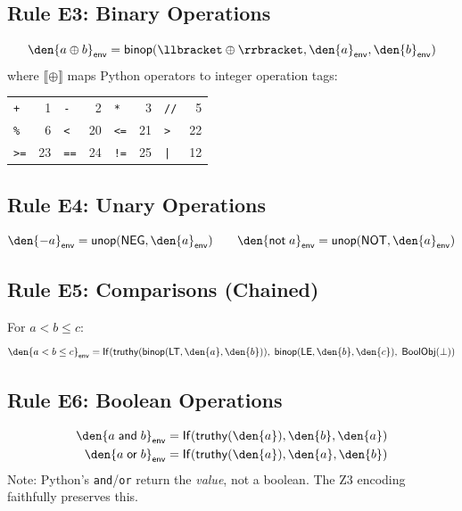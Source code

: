 \subsection{Rule E3: Binary Operations}
\[
  \den{a \oplus b}_\mathsf{env} = \mathsf{binop}(\llbracket \oplus \rrbracket,
    \den{a}_\mathsf{env}, \den{b}_\mathsf{env})
\]
where $\llbracket \oplus \rrbracket$ maps Python operators to integer
operation tags:
\begin{center}
\small
\begin{tabular}{l r l r l r l r}
  \texttt{+} & 1 & \texttt{-} & 2 & \texttt{*} & 3 &
  \texttt{//} & 5 \\
  \texttt{\%} & 6 & \texttt{<} & 20 & \texttt{<=} & 21 &
  \texttt{>} & 22 \\
  \texttt{>=} & 23 & \texttt{==} & 24 & \texttt{!=} & 25 &
  \texttt{|} & 12 \\
\end{tabular}
\end{center}

\subsection{Rule E4: Unary Operations}
\[
  \den{-a}_\mathsf{env} = \mathsf{unop}(\mathsf{NEG}, \den{a}_\mathsf{env})
  \qquad
  \den{\mathsf{not}\; a}_\mathsf{env} = \mathsf{unop}(\mathsf{NOT},
    \den{a}_\mathsf{env})
\]

\subsection{Rule E5: Comparisons (Chained)}
For $a < b \leq c$:
\[
  \den{a < b \leq c}_\mathsf{env} = \mathsf{If}(
    \mathsf{truthy}(\mathsf{binop}(\mathsf{LT}, \den{a}, \den{b})),\;
    \mathsf{binop}(\mathsf{LE}, \den{b}, \den{c}),\;
    \mathsf{BoolObj}(\bot))
\]

\subsection{Rule E6: Boolean Operations}
\begin{align}
  \den{a \;\mathsf{and}\; b}_\mathsf{env} &= \mathsf{If}(
    \mathsf{truthy}(\den{a}), \den{b}, \den{a}) \\
  \den{a \;\mathsf{or}\; b}_\mathsf{env} &= \mathsf{If}(
    \mathsf{truthy}(\den{a}), \den{a}, \den{b})
\end{align}
Note: Python's \texttt{and}/\texttt{or} return the \emph{value}, not
a boolean.  The Z3 encoding faithfully preserves this.

